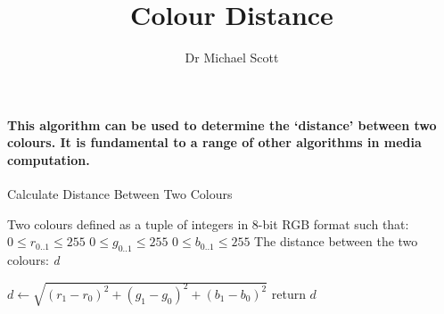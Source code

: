\documentclass{../../fal_assignment}
\title{Colour Distance}
\author{Dr Michael Scott}
\begin{document}
\maketitle

\paragraph{This algorithm can be used to determine the `distance' between two colours. It is fundamental to a range of other algorithms in media computation. }

\begin{algorithm}[ht]
\caption{Calculate Distance Between Two Colours}
\label{alg:algorithm}

\begin{algorithmic}[1]
\Require 
\Statex Two colours defined as a tuple of integers in 8-bit RGB format such that:
\Statex $0 \leq r_{0..1} \leq 255$
\Statex $0 \leq g_{0..1} \leq 255$
\Statex $0 \leq b_{0..1} \leq 255$
\Ensure
\Statex The distance between the two colours:
\Statex \textit{d}

\Statex

\State $d \leftarrow \sqrt{ (r_1 - r_0)^2 + (g_1 - g_0)^2 + (b_1 - b_0)^2}$
\State return $d$
\end{algorithmic}

\end{algorithm}
\end{document}
